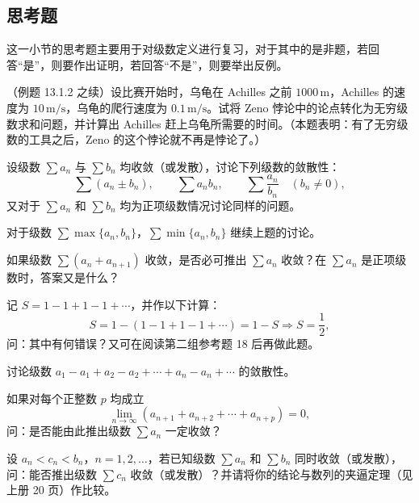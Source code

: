 \subsection{思考题}

这一小节的思考题主要用于对级数定义进行复习，对于其中的是非题，若回答“是”，则要作出证明，若回答“不是”，则要举出反例。

\begin{xthought}[1]
（例题 13.1.2 之续）设比赛开始时，乌龟在 Achilles 之前 $1000\,\mathrm m$，Achilles 的速度为 $10\,\mathrm{m/s}$，乌龟的爬行速度为 $0.1\,\mathrm{m/s}$。试将 Zeno 悖论中的论点转化为无穷级数求和问题，并计算出 Achilles 赶上乌龟所需要的时间。（本题表明：有了无穷级数的工具之后，Zeno 的这个悖论就不再是悖论了。）
\end{xthought}

\begin{xthought}[2]
设级数 $\sum a_n$ 与 $\sum b_n$ 均收敛（或发散），讨论下列级数的敛散性：
\[
\sum(a_n\pm b_n),\qquad \sum a_nb_n,\qquad \sum\frac{a_n}{b_n}\quad(b_n\neq0),
\]
又对于 $\sum a_n$ 和 $\sum b_n$ 均为正项级数情况讨论同样的问题。
\end{xthought}

\begin{xthought}[3]
对于级数 $\sum\max\{a_n,b_n\}$，$\sum\min\{a_n,b_n\}$ 继续上题的讨论。
\end{xthought}

\begin{xthought}[4]
如果级数 $\sum(a_n+a_{n+1})$ 收敛，是否必可推出 $\sum a_n$ 收敛？在 $\sum a_n$ 是正项级数时，答案又是什么？
\end{xthought}

\begin{xthought}[5]
记 $S=1-1+1-1+\cdots$，并作以下计算：
\[
S=1-(1-1+1-1+\cdots)=1-S\Rightarrow S=\frac12,
\]
问：其中有何错误？又可在阅读第二组参考题 18 后再做此题。
\end{xthought}

\begin{xthought}[6]
讨论级数 $a_1-a_1+a_2-a_2+\cdots+a_n-a_n+\cdots$ 的敛散性。
\end{xthought}

\begin{xthought}[7]
如果对每个正整数 $p$ 均成立
\[
\lim_{n\to\infty}(a_{n+1}+a_{n+2}+\cdots+a_{n+p})=0,
\]
问：是否能由此推出级数 $\sum a_n$ 一定收敛？
\end{xthought}

\begin{xthought}[8]
设 $a_n<c_n<b_n$，$n=1,2,\ldots$，若已知级数 $\sum a_n$ 和 $\sum b_n$ 同时收敛（或发散），问：能否推出级数 $\sum c_n$ 收敛（或发散）？并请将你的结论与数列的夹逼定理（见上册 20 页）作比较。
\end{xthought}

